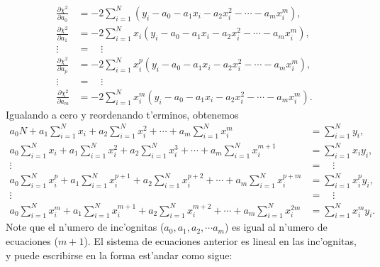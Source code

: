 \documentclass[letterpaper,11pt]{report}
\begin{document}
\begin{align}
\frac{\partial\chi^2}{\partial a_0} &= -2\sum_{i=1}^N \left(y_i-a_0-a_1x_i-a_2x_i^2-\cdots -a_mx_i^m\right) ,\\
\frac{\partial\chi^2}{\partial a_1} &= -2\sum_{i=1}^N x_i\left(y_i-a_0-a_1x_i-a_2x_i^2-\cdots -a_mx_i^m\right) ,\\
\vdots \quad &= \quad \vdots  \\
\frac{\partial\chi^2}{\partial a_p} &= -2\sum_{i=1}^N x_i^p\left(y_i-a_0-a_1x_i-a_2x_i^2-\cdots -a_mx_i^m\right) ,\\
\vdots \quad &= \quad \vdots  \\
\frac{\partial\chi^2}{\partial a_m} &= -2\sum_{i=1}^N x_i^m\left(y_i-a_0-a_1x_i-a_2x_i^2-\cdots -a_mx_i^m\right).
\end{align}
Igualando a cero y reordenando t'erminos, obtenemos
\begin{align}
a_0 N + a_1\sum_{i=1}^N x_i +a_2 \sum_{i=1}^N x_i^2 + \cdots + a_m \sum_{i=1}^N x_i^m &= \sum_{i=1}^N y_i, \\
a_0 \sum_{i=1}^N x_i + a_1\sum_{i=1}^N x_i^2 +a_2 \sum_{i=1}^N x_i^3 + \cdots + a_m \sum_{i=1}^N x_i^{m+1} &= \sum_{i=1}^N x_iy_i, \\
\vdots\quad &= \quad \vdots \\
a_0 \sum_{i=1}^N x_i^p + a_1\sum_{i=1}^N x_i^{p+1} +a_2 \sum_{i=1}^N x_i^{p+2} + \cdots + a_m \sum_{i=1}^N x_i^{p+m} &= \sum_{i=1}^N x_i^py_i, \\
\vdots\quad &= \quad \vdots \\
a_0 \sum_{i=1}^N x_i^m + a_1\sum_{i=1}^N x_i^{m+1} +a_2 \sum_{i=1}^N x_i^{m+2} + \cdots + a_m \sum_{i=1}^N x_i^{2m} &= \sum_{i=1}^N x_i^my_i.
\end{align}
Note que el n'umero de inc'ognitas ($a_0, a_1, a_2,\cdots a_m$) es igual al n'umero de ecuaciones ($m+1$). El sistema de ecuaciones anterior es lineal en las inc'ognitas, y puede escribirse en la forma est'andar como sigue:
\end{document}
